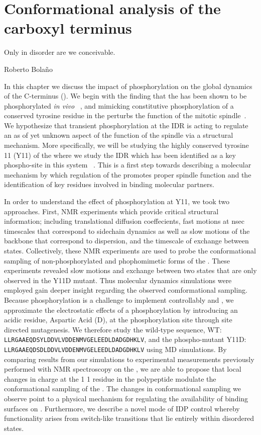 \chapter{Conformational analysis of the \tub carboxyl terminus}

\epigraph{Only in disorder are we conceivable.}{Roberto Bola\~no}

In this chapter we discuss the impact of phosphorylation on the global dynamics of the \tub C-terminus (\gct). We begin with the finding that the \gct has been shown to be phosphorylated {\it in vivo} ~\cite{keck2011cell}, and mimicking constitutive phosphorylation of a conserved tyrosine residue in the \gct perturbs the function of the mitotic spindle~\cite{vogel2001phosphorylation}. We hypothesize  that  transient phosphorylation at  the \gct IDR  is acting  to  regulate an as of yet unknown aspect of the function of the spindle via a structural mechanism. More specifically, we will be studying  the highly conserved tyrosine 11 (Y11) of the \gct where we study the IDR which has been identified as a key phospho-site  in this system ~\cite{vogel2001phosphorylation}. This is a first step towards describing a molecular mechanism by which regulation of the \gct promotes proper spindle function and the identification of key residues involved in binding molecular partners. 

In order to understand the effect of phosphorylation at Y11, we took two approaches. First, NMR experiments which provide critical structural information; including translational diffusion coeffecients, fast motions at nsec timescales that correspond to sidechain dynamics as well as slow motions of the backbone that correspond to dispersion, and the timescale of exchange between states. Collectively, these NMR experiments are used to probe the conformational sampling  of non-phosphorylated  and  phophomimetic forms of the  \gct. These experiments revealed slow motions and exchange between two states that are only observed in the Y11D mutant.  Thus molecular dynamics simulations were employed gain deeper insight regarding the observed comformational sampling. Because phosphorylation is  a challenge to  implement  controllably  \vivo and \vitro, we approximate the electrostatic  effects of a phosphorylation by introducing an acidic residue, Aspartic  Acid (D),  at  the phosphorylation site through site directed mutagenesis. We therefore study the wild-type sequence, WT: \texttt{LLRGAAEQDSYLDDVLVDDENMVGELEEDLDADGDHKLV}, and the phospho-mutant Y11D: \texttt{LLRGAAEQDSDLDDVLVDDENMVGELEEDLDADGDHKLV} using MD simulations. By comparing results from our simulations to experimental measurements previously performed with NMR spectroscopy on the \gct, we are able to propose that local changes in charge at the 1	1 residue in the polypeptide modulate the conformational sampling of the \gct. The changes in conformational sampling we observe point to a physical mechanism for regulating the availability of binding surfaces on \tub. Furthermore, we describe a novel mode of IDP control whereby functionality arises from switch-like transitions that lie entirely within disordered states.

